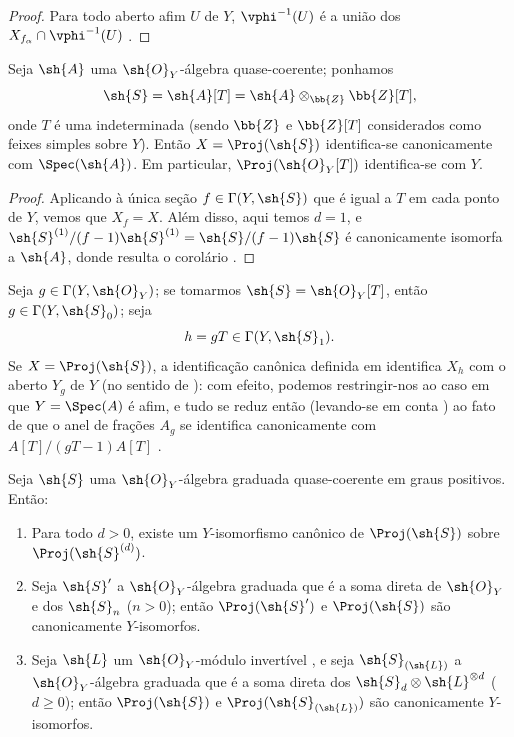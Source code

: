 \documentclass[oneside,10pt]{amsart}
\renewcommand{\geq}{\geqslant}
\newcommand{\oldpage}[2][]{\marginnote{\normalfont\footnotesize\textbf{#1}~|~#2}\ignorespaces}
\let\EGAOriginalLabel\label
\renewcommand{\label}[1]{\phantomsection\EGAOriginalLabel{#1}}
\begin{document}
\begin{proof}
Para todo aberto afim $U$ de $Y$, $\vphi^{-1}(U)$ é a união dos $X_{f_\alpha}\cap\vphi^{-1}(U)$ .
\end{proof}

\begin{corollary}[3.1.7]
\label{II.3.1.7}
Seja $\sh{A}$ uma $\sh{O}_Y$-álgebra quase-coerente;
ponhamos
\[
  \sh{S}=\sh{A}[T]=\sh{A}\otimes_{\bb{Z}}\bb{Z}[T],
\]
onde $T$ é uma indeterminada (sendo $\bb{Z}$ e $\bb{Z}[T]$ considerados como feixes simples sobre $Y$).
Então $X=\Proj(\sh{S})$ identifica-se canonicamente com $\Spec(\sh{A})$.
Em particular, $\Proj(\sh{O}_Y[T])$ identifica-se com $Y$.
\end{corollary}

\begin{proof}
Aplicando  à única seção $f\in\Gamma(Y,\sh{S})$ que é igual a $T$ em cada ponto de $Y$, vemos que $X_f=X$.
Além disso, aqui temos $d=1$, e $\sh{S}^{(1)}/(f-1)\sh{S}^{(1)}=\sh{S}/(f-1)\sh{S}$ é canonicamente isomorfa a $\sh{A}$, donde resulta o corolário .
\end{proof}

Seja $g\in\Gamma(Y,\sh{O}_Y)$;
se tomarmos $\sh{S}=\sh{O}_Y[T]$, então $g\in\Gamma(Y,\sh{S}_0)$;
seja
\[
  h=gT\in\Gamma(Y,\sh{S}_1).
\]
Se $X=\Proj(\sh{S})$, a identificação canônica definida em  identifica $X_h$ com o aberto $Y_g$ de $Y$ (no sentido de ):
com efeito, podemos restringir-nos ao caso em que $Y=\Spec(A)$ é afim, e tudo se reduz então (levando-se em conta ) ao fato de que o anel de frações $A_g$ se identifica canonicamente com $A[T]/(gT-1)A[T]$ .

\begin{proposition}[3.1.8]
\label{II.3.1.8}
Seja $\sh{S}$ uma $\sh{O}_Y$-álgebra graduada quase-coerente em graus positivos.
Então:
\begin{enumerate}
  \item[(i)] Para todo $d>0$, existe um $Y$-isomorfismo canônico de $\Proj(\sh{S})$ sobre $\Proj(\sh{S}^{(d)})$.
\oldpage[II]{52}
  \item[(ii)] Seja $\sh{S}'$ a $\sh{O}_Y$-álgebra graduada que é a soma direta de $\sh{O}_Y$ e dos $\sh{S}_n$ ($n>0$);
    então $\Proj(\sh{S}')$ e $\Proj(\sh{S})$ são canonicamente $Y$-isomorfos.
  \item[(iii)] Seja $\sh{L}$ um $\sh{O}_Y$-módulo invertível , e seja $\sh{S}_{(\sh{L})}$ a $\sh{O}_Y$-álgebra graduada que é a soma direta dos $\sh{S}_d\otimes\sh{L}^{\otimes d}$ ($d\geq0$);
    então $\Proj(\sh{S})$ e $\Proj(\sh{S}_{(\sh{L})})$ são canonicamente $Y$-isomorfos.
\end{enumerate}
\end{proposition}
\end{document}
